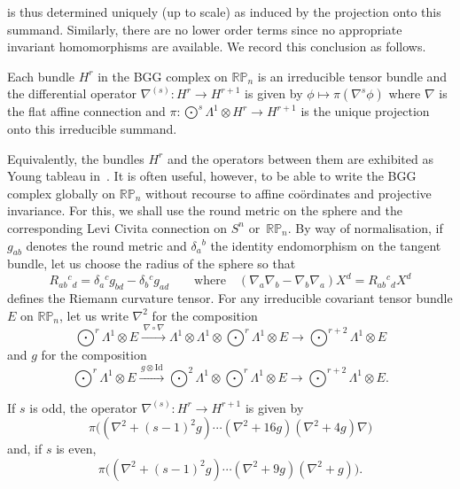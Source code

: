 \documentclass[pdftex]{sigma}
\begin{document}
is thus determined uniquely (up to scale) as induced by the projection onto
this summand. Similarly, there are no lower order terms since no appropriate
invariant homomorphisms are available. We record this conclusion as follows.
\begin{theorem}
Each bundle $H^r$ in the BGG complex on ${\mathbb{RP}}_n$ is an irreducible
tensor bundle and the differential operator $\nabla^{(s)}:H^r\to H^{r+1}$ is
given by $\phi\mapsto\pi(\nabla^s\phi)$ where $\nabla$ is the flat affine
connection and $\pi:\bigodot^s\!\Lambda^1\otimes H^r\to H^{r+1}$ is the unique
projection onto this irreducible summand.
\end{theorem}
Equivalently, the bundles $H^r$ and the operators between them are exhibited as
Young tableau in~\cite{eProjective}. It is often useful, however, to be
able to write the BGG complex globally on ${\mathbb{RP}}_n$ without recourse to
af\/f\/ine co\"ordinates and projective invariance. For this, we shall use the
round metric on the sphere and the corresponding Levi Civita connection on
$S^n$ or~${\mathbb{RP}}_n$. By way of normalisation, if $g_{ab}$ denotes the
round metric and $\delta_a{}^b$ the identity endomorphism on the tangent
bundle, let us choose the radius of the sphere so that
\begin{equation}\label{cc}
R_{ab}{}^c{}_d=\delta_a{}^cg_{bd}-\delta_b{}^cg_{ad}\qquad\mbox{where}\quad
(\nabla_a\nabla_b-\nabla_b\nabla_a)X^d=R_{ab}{}^c{}_dX^d\end{equation}
def\/ines the Riemann curvature tensor. For any irreducible covariant tensor
bundle $E$ on ${\mathbb{RP}}_n$, let us write $\nabla^2$ for the composition
\[\textstyle\bigodot^r\!\Lambda^1\otimes E\xrightarrow{\,\nabla\circ\nabla\,}
\Lambda^1\otimes\Lambda^1\otimes\bigodot^r\!\Lambda^1\otimes E\to
\bigodot^{r+2}\!\Lambda^1\otimes E\]
and $g$ for the composition
\[\textstyle\bigodot^r\!\Lambda^1\otimes E
\xrightarrow{\,g\otimes{\mathrm{Id}}\,}
\bigodot^2\!\Lambda^1\otimes\bigodot^r\!\Lambda^1\otimes E\to
\bigodot^{r+2}\!\Lambda^1\otimes E.\]
\begin{theorem}\label{round_formulae}
If $s$ is odd, the operator $\nabla^{(s)}:H^r\to H^{r+1}$ is given by
\[\pi\big((\nabla^2+(s-1)^2g)\cdots(\nabla^2+16g)(\nabla^2+4g)\nabla\big)\]
and, if $s$ is even,
\[\pi\big((\nabla^2+(s-1)^2g)\cdots(\nabla^2+9g)(\nabla^2+g)\big).\]
\end{theorem}
\end{document}
